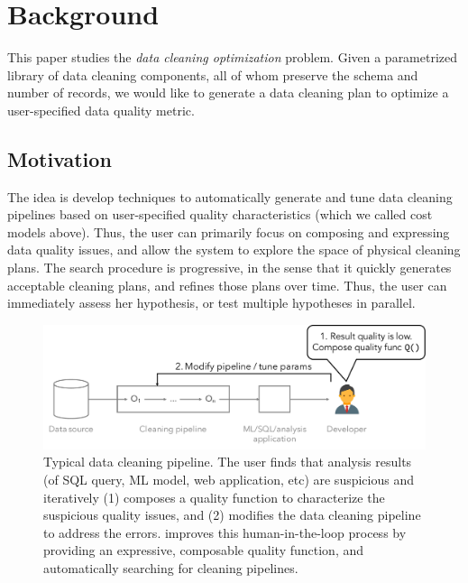 \section{Background}
This paper studies the \emph{data cleaning optimization} problem. 
Given a parametrized library of data cleaning components, all of whom preserve the schema and number of records, we would like to generate a data cleaning plan to optimize a user-specified data quality metric.

\subsection{Motivation}
The idea is develop techniques to automatically generate and tune data cleaning pipelines based on user-specified quality characteristics (which we called cost models above).  Thus, the user can primarily focus on composing and expressing data quality issues, and allow the system to explore the space of physical cleaning plans.  The search procedure is progressive, in the sense that it quickly generates acceptable cleaning plans, and refines those plans over time.  Thus, the user can immediately assess her hypothesis, or test multiple hypotheses in parallel.


\begin{figure}[t]
  \centering
 \includegraphics[width=\columnwidth]{figures/user-pipeline}
 \caption{\small Typical data cleaning pipeline.  The user finds that analysis results (of SQL query, ML model, web application, etc) are suspicious and iteratively (1) composes a quality function to characterize the suspicious quality issues, and (2) modifies the data cleaning pipeline to address the errors.  \sys improves this human-in-the-loop process by providing an expressive, composable quality function, and automatically searching for cleaning pipelines.  \label{fig:user-pipeline}}
\end{figure}


